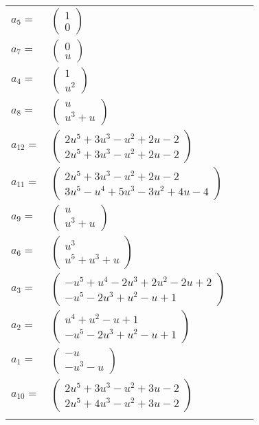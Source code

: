 \documentclass[1p]{elsarticle_modified}
\theoremstyle{definition}
\begin{document}
\begin{tabular}{m{7pt} m{180pt} m{7pt} m{180pt} }
\flushright $a_{5}=$&$\begin{pmatrix}1\\0\end{pmatrix}$ \\
\flushright $a_{7}=$&$\begin{pmatrix}0\\u\end{pmatrix}$ \\
\flushright $a_{4}=$&$\begin{pmatrix}1\\u^2\end{pmatrix}$ \\
\flushright $a_{8}=$&$\begin{pmatrix}u\\u^3+u\end{pmatrix}$ \\
\flushright $a_{12}=$&$\begin{pmatrix}2 u^5+3 u^3- u^2+2 u-2\\2 u^5+3 u^3- u^2+2 u-2\end{pmatrix}$ \\
\flushright $a_{11}=$&$\begin{pmatrix}2 u^5+3 u^3- u^2+2 u-2\\3 u^5- u^4+5 u^3-3 u^2+4 u-4\end{pmatrix}$ \\
\flushright $a_{9}=$&$\begin{pmatrix}u\\u^3+u\end{pmatrix}$ \\
\flushright $a_{6}=$&$\begin{pmatrix}u^3\\u^5+u^3+u\end{pmatrix}$ \\
\flushright $a_{3}=$&$\begin{pmatrix}- u^5+u^4-2 u^3+2 u^2-2 u+2\\- u^5-2 u^3+u^2- u+1\end{pmatrix}$ \\
\flushright $a_{2}=$&$\begin{pmatrix}u^4+u^2- u+1\\- u^5-2 u^3+u^2- u+1\end{pmatrix}$ \\
\flushright $a_{1}=$&$\begin{pmatrix}- u\\- u^3- u\end{pmatrix}$ \\
\flushright $a_{10}=$&$\begin{pmatrix}2 u^5+3 u^3- u^2+3 u-2\\2 u^5+4 u^3- u^2+3 u-2\end{pmatrix}$\\&\end{tabular}
\end{document}

